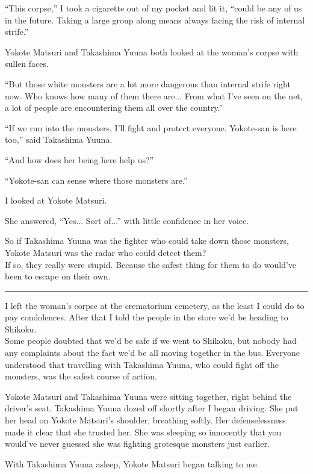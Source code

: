 ``This corpse,'' I took a cigarette out of my pocket and lit it, ``could be any of us in the future. Taking a large group along means always facing the risk of internal strife.''

Yokote Matsuri and Takashima Yuuna both looked at the woman's corpse with sullen faces.

``But those white monsters are a lot more dangerous than internal strife right now. Who knows how many of them there are... From what I've seen on the net, a lot of people are encountering them all over the country.''

``If we run into the monsters, I'll fight and protect everyone. Yokote-san is here too,'' said Takashima Yuuna.

``And how does her being here help us?''

``Yokote-san can sense where those monsters are.''

I looked at Yokote Matsuri.

She answered, ``Yes... Sort of...'' with little confidence in her voice.

So if Takashima Yuuna was the fighter who could take down those monsters, Yokote Matsuri was the radar who could detect them?\\
If so, they really were stupid. Because the safest thing for them to do would've been to escape on their own.

\vspace{\baselineskip}
\hrule
\vspace{\baselineskip}

I left the woman's corpse at the crematorium cemetery, as the least I could do to pay condolences. After that I told the people in the store we'd be heading to Shikoku. \\
Some people doubted that we'd be safe if we went to Shikoku, but nobody had any complaints about the fact we'd be all moving together in the bus. Everyone understood that travelling with Takashima Yuuna, who could fight off the monsters, was the safest course of action.

Yokote Matsuri and Takashima Yuuna were sitting together, right behind the driver's seat. Takashima Yuuna dozed off shortly after I began driving. She put her head on Yokote Matsuri's shoulder, breathing softly. Her defenselessness made it clear that she trusted her. She was sleeping so innocently that you would've never guessed she was fighting grotesque monsters just earlier.

With Takashima Yuuna asleep, Yokote Matsuri began talking to me.

